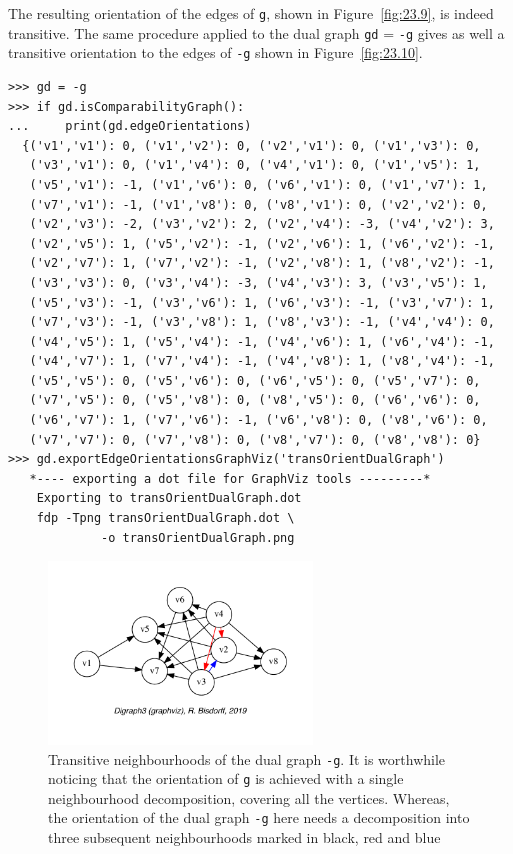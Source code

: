 The resulting orientation of the edges of \texttt{g}, shown in Figure~\vref{fig:23.9}, is indeed transitive. The same procedure applied to the dual graph \texttt{gd} = \texttt{-g} gives as well a transitive orientation to the edges of \texttt{-g} shown in Figure~\vref{fig:23.10}.
\begin{lstlisting}[basicstyle=\ttfamily\scriptsize]
>>> gd = -g
>>> if gd.isComparabilityGraph():
...     print(gd.edgeOrientations) 
  {('v1','v1'): 0, ('v1','v2'): 0, ('v2','v1'): 0, ('v1','v3'): 0,
   ('v3','v1'): 0, ('v1','v4'): 0, ('v4','v1'): 0, ('v1','v5'): 1,
   ('v5','v1'): -1, ('v1','v6'): 0, ('v6','v1'): 0, ('v1','v7'): 1,
   ('v7','v1'): -1, ('v1','v8'): 0, ('v8','v1'): 0, ('v2','v2'): 0,
   ('v2','v3'): -2, ('v3','v2'): 2, ('v2','v4'): -3, ('v4','v2'): 3,
   ('v2','v5'): 1, ('v5','v2'): -1, ('v2','v6'): 1, ('v6','v2'): -1,
   ('v2','v7'): 1, ('v7','v2'): -1, ('v2','v8'): 1, ('v8','v2'): -1,
   ('v3','v3'): 0, ('v3','v4'): -3, ('v4','v3'): 3, ('v3','v5'): 1,
   ('v5','v3'): -1, ('v3','v6'): 1, ('v6','v3'): -1, ('v3','v7'): 1,
   ('v7','v3'): -1, ('v3','v8'): 1, ('v8','v3'): -1, ('v4','v4'): 0,
   ('v4','v5'): 1, ('v5','v4'): -1, ('v4','v6'): 1, ('v6','v4'): -1,
   ('v4','v7'): 1, ('v7','v4'): -1, ('v4','v8'): 1, ('v8','v4'): -1,
   ('v5','v5'): 0, ('v5','v6'): 0, ('v6','v5'): 0, ('v5','v7'): 0,
   ('v7','v5'): 0, ('v5','v8'): 0, ('v8','v5'): 0, ('v6','v6'): 0,
   ('v6','v7'): 1, ('v7','v6'): -1, ('v6','v8'): 0, ('v8','v6'): 0,
   ('v7','v7'): 0, ('v7','v8'): 0, ('v8','v7'): 0, ('v8','v8'): 0}
>>> gd.exportEdgeOrientationsGraphViz('transOrientDualGraph')
   *---- exporting a dot file for GraphViz tools ---------*
    Exporting to transOrientDualGraph.dot
    fdp -Tpng transOrientDualGraph.dot \
             -o transOrientDualGraph.png
\end{lstlisting}
\begin{figure}[ht]
\sidecaption[t]
\includegraphics[width=7cm]{Figures/23-10-transOrientDualGraph.pdf}
\caption[Transitive neighbourhoods of the dual graph]{Transitive neighbourhoods of the dual graph \texttt{-g}. It is worthwhile noticing that the orientation of \texttt{g} is achieved with a single neighbourhood decomposition, covering all the vertices. Whereas, the orientation of the dual graph \texttt{-g} here needs a decomposition into three subsequent neighbourhoods marked in black, red and blue} 
\label{fig:23.10}       %
\end{figure}
 
